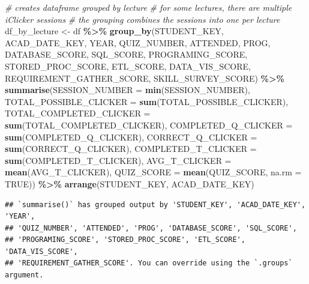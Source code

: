 \documentclass[
]{article}
\newenvironment{Shaded}{\begin{snugshade}}{\end{snugshade}}
\newcommand{\AttributeTok}[1]{\textcolor[rgb]{0.13,0.29,0.53}{#1}}
\newcommand{\CommentTok}[1]{\textcolor[rgb]{0.56,0.35,0.01}{\textit{#1}}}
\newcommand{\ConstantTok}[1]{\textcolor[rgb]{0.56,0.35,0.01}{#1}}
\newcommand{\FunctionTok}[1]{\textcolor[rgb]{0.13,0.29,0.53}{\textbf{#1}}}
\newcommand{\NormalTok}[1]{#1}
\newcommand{\OtherTok}[1]{\textcolor[rgb]{0.56,0.35,0.01}{#1}}
\newcommand{\SpecialCharTok}[1]{\textcolor[rgb]{0.81,0.36,0.00}{\textbf{#1}}}
\begin{document}
\begin{Shaded}
\begin{Highlighting}[]
\CommentTok{\# creates dataframe grouped by lecture}
\CommentTok{\# for some lectures, there are multiple iClicker sessions}
\CommentTok{\# the grouping combines the sessions into one per lecture}
\NormalTok{df\_by\_lecture }\OtherTok{\textless{}{-}}\NormalTok{ df }\SpecialCharTok{\%\textgreater{}\%}
  \FunctionTok{group\_by}\NormalTok{(STUDENT\_KEY, }
\NormalTok{           ACAD\_DATE\_KEY, }
\NormalTok{           YEAR, }
\NormalTok{           QUIZ\_NUMBER,}
\NormalTok{           ATTENDED, }
\NormalTok{           PROG,}
\NormalTok{           DATABASE\_SCORE, }
\NormalTok{           SQL\_SCORE, }
\NormalTok{           PROGRAMING\_SCORE,}
\NormalTok{           STORED\_PROC\_SCORE,}
\NormalTok{           ETL\_SCORE,}
\NormalTok{           DATA\_VIS\_SCORE,}
\NormalTok{           REQUIREMENT\_GATHER\_SCORE,}
\NormalTok{           SKILL\_SURVEY\_SCORE) }\SpecialCharTok{\%\textgreater{}\%}
  \FunctionTok{summarise}\NormalTok{(}\AttributeTok{SESSION\_NUMBER =} \FunctionTok{min}\NormalTok{(SESSION\_NUMBER),}
            \AttributeTok{TOTAL\_POSSIBLE\_CLICKER =} \FunctionTok{sum}\NormalTok{(TOTAL\_POSSIBLE\_CLICKER),}
            \AttributeTok{TOTAL\_COMPLETED\_CLICKER =} \FunctionTok{sum}\NormalTok{(TOTAL\_COMPLETED\_CLICKER),}
            \AttributeTok{COMPLETED\_Q\_CLICKER =} \FunctionTok{sum}\NormalTok{(COMPLETED\_Q\_CLICKER),}
            \AttributeTok{CORRECT\_Q\_CLICKER =} \FunctionTok{sum}\NormalTok{(CORRECT\_Q\_CLICKER),}
            \AttributeTok{COMPLETED\_T\_CLICKER =} \FunctionTok{sum}\NormalTok{(COMPLETED\_T\_CLICKER),}
            \AttributeTok{AVG\_T\_CLICKER =} \FunctionTok{mean}\NormalTok{(AVG\_T\_CLICKER),}
            \AttributeTok{QUIZ\_SCORE =} \FunctionTok{mean}\NormalTok{(QUIZ\_SCORE, }\AttributeTok{na.rm =} \ConstantTok{TRUE}\NormalTok{)) }\SpecialCharTok{\%\textgreater{}\%}
  \FunctionTok{arrange}\NormalTok{(STUDENT\_KEY, ACAD\_DATE\_KEY)}
\end{Highlighting}
\end{Shaded}

\begin{verbatim}
## `summarise()` has grouped output by 'STUDENT_KEY', 'ACAD_DATE_KEY', 'YEAR',
## 'QUIZ_NUMBER', 'ATTENDED', 'PROG', 'DATABASE_SCORE', 'SQL_SCORE',
## 'PROGRAMING_SCORE', 'STORED_PROC_SCORE', 'ETL_SCORE', 'DATA_VIS_SCORE',
## 'REQUIREMENT_GATHER_SCORE'. You can override using the `.groups` argument.
\end{verbatim}
\end{document}
